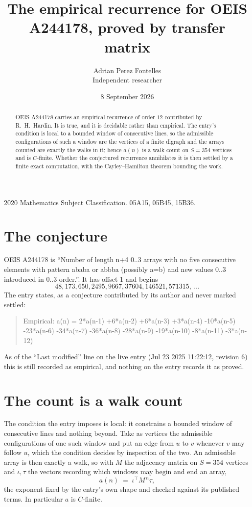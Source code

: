\documentclass[11pt,a4paper]{article}
\title{The empirical recurrence for OEIS A244178, proved by transfer matrix}
\author{Adrian Perez Fontelles\\ \small Independent researcher}
\date{8 September 2026}
\theoremstyle{plain}
\theoremstyle{definition}
\begin{document}
\maketitle

\begin{abstract}
OEIS A244178 carries an empirical recurrence of order $12$ contributed by R.~H.~Hardin. It is
true, and it is decidable rather than empirical. The entry's condition is local to a bounded window of consecutive lines, so
the admissible configurations of such a window are the vertices of a finite digraph and the
arrays counted are exactly the walks in it; hence $a(n)$ is a walk count on $S=354$ vertices
and is $C$-finite. Whether the conjectured recurrence annihilates it is then settled by a
finite exact computation, with the Cayley--Hamilton theorem bounding the work.
\end{abstract}

\noindent\small 2020 Mathematics Subject Classification. 05A15, 05B45, 15B36.\normalsize

\section{The conjecture}

OEIS A244178 is ``Number of length n+4 0..3 arrays with no five consecutive elements with pattern ababa or abbba (possibly a=b) and new values 0..3 introduced in 0..3 order.''. It has offset $1$ and begins
\[
48, 173, 650, 2495, 9667, 37604, 146521, 571315,\ \dots
\]
The entry states, as a conjecture contributed by its author and never marked settled:
\begin{quote}
Empirical: a(n) = 2*a(n-1) +6*a(n-2) +6*a(n-3) +3*a(n-4) -10*a(n-5) -23*a(n-6) -34*a(n-7) -36*a(n-8) -28*a(n-9) -19*a(n-10) -8*a(n-11) -3*a(n-12)
\end{quote}
As of the ``Last modified'' line on the live entry (Jul 23 2025 11:22:12, revision 6) this is still
recorded as empirical, and nothing on the entry records it as proved.

\section{The count is a walk count}

The condition the entry imposes is local: it constrains a bounded window of consecutive lines and nothing beyond. Take as
vertices the admissible configurations of one such window and put an edge from $u$ to $v$
whenever $v$ may follow $u$, which the condition decides by inspection of the two. An
admissible array is then exactly a walk, so with $M$ the adjacency matrix on $S=354$ vertices
and $\iota,\tau$ the vectors recording which windows may begin and end an array,
\[
a(n)\;=\;\iota^{\!\top}M^{\,n}\tau ,
\]
the exponent fixed by the entry's own shape and checked against its published terms. In
particular $a$ is $C$-finite.
\end{document}
